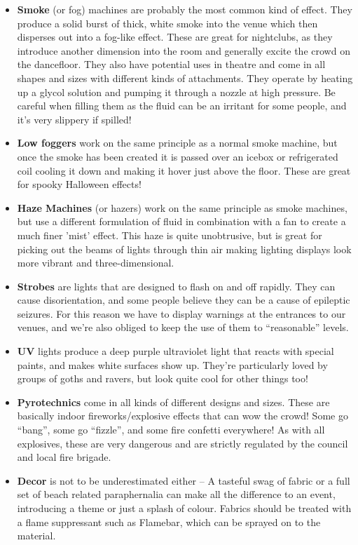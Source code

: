 \documentclass[14pt]{article} %
\begin{document}
\begin{itemize}
\item \textbf{Smoke} (or fog) machines are probably the most common kind of effect. They produce a solid burst of thick, white smoke into the venue which then disperses out into a fog-like effect. These are great for nightclubs, as they introduce another dimension into the room and generally excite the crowd on the dancefloor. They also have potential uses in theatre and come in all shapes and sizes with different kinds of attachments. They operate by heating up a glycol solution and pumping it through a nozzle at high pressure. Be careful when filling them as the fluid can be an irritant for some people, and it's very slippery if spilled!

\item \textbf{Low foggers} work on the same principle as a normal smoke machine, but once the smoke has been created it is passed over an icebox or refrigerated coil cooling it down and making it hover just above the floor. These are great for spooky Halloween effects!

\item \textbf{Haze Machines} (or hazers) work on the same principle as smoke machines, but use a different formulation of fluid in combination with a fan to create a much finer 'mist' effect. This haze is quite unobtrusive, but is great for picking out the beams of lights through thin air making lighting displays look more vibrant and three-dimensional. 

\item \textbf{Strobes} are lights that are designed to flash on and off rapidly. They can cause disorientation, and some people believe they can be a cause of epileptic seizures. For this reason we have to display warnings at the entrances to our venues, and we’re also obliged to keep the use of them to “reasonable” levels.

\item \textbf{UV} lights produce a deep purple ultraviolet light that reacts with special paints, and makes white surfaces show up. They’re particularly loved by groups of goths and ravers, but look quite cool for other things too!

\item \textbf{Pyrotechnics} come in all kinds of different designs and sizes. These are basically indoor fireworks/explosive effects that can wow the crowd! Some go “bang”, some go “fizzle”, and some fire confetti everywhere! As with all explosives, these are very dangerous and are strictly regulated by the council and local fire brigade. 

\item \textbf{Decor} is not to be underestimated either – A tasteful swag of fabric or a full set of beach related paraphernalia can make all the difference to an event, introducing a theme or just a splash of colour. Fabrics should be treated with a flame suppressant such as Flamebar, which can be sprayed on to the material.

\end{itemize}
\end{document}
